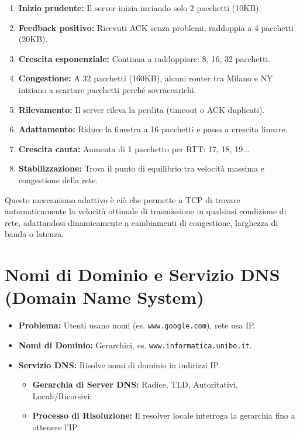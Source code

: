 \begin{enumerate}
    \item \textbf{Inizio prudente:} Il server inizia inviando solo 2 pacchetti (10KB).
    \item \textbf{Feedback positivo:} Ricevuti ACK senza problemi, raddoppia a 4 pacchetti (20KB).
    \item \textbf{Crescita esponenziale:} Continua a raddoppiare: 8, 16, 32 pacchetti.
    \item \textbf{Congestione:} A 32 pacchetti (160KB), alcuni router tra Milano e NY iniziano a scartare pacchetti perché sovraccarichi.
    \item \textbf{Rilevamento:} Il server rileva la perdita (timeout o ACK duplicati).
    \item \textbf{Adattamento:} Riduce la finestra a 16 pacchetti e passa a crescita lineare.
    \item \textbf{Crescita cauta:} Aumenta di 1 pacchetto per RTT: 17, 18, 19...
    \item \textbf{Stabilizzazione:} Trova il punto di equilibrio tra velocità massima e congestione della rete.
\end{enumerate}

Questo meccanismo adattivo è ciò che permette a TCP di trovare automaticamente la velocità ottimale di trasmissione in qualsiasi condizione di rete, adattandosi dinamicamente a cambiamenti di congestione, larghezza di banda o latenza.

\section{Nomi di Dominio e Servizio DNS (Domain Name System)}
\begin{itemize}
    \item \textbf{Problema:} Utenti usano nomi (es. \texttt{www.google.com}), rete usa IP.
    \item \textbf{Nomi di Dominio:} Gerarchici, es. \texttt{www.informatica.unibo.it}.
    \item \textbf{Servizio DNS:} Risolve nomi di dominio in indirizzi IP.
    \begin{itemize}
        \item \textbf{Gerarchia di Server DNS:} Radice, TLD, Autoritativi, Locali/Ricorsivi.
        \item \textbf{Processo di Risoluzione:} Il resolver locale interroga la gerarchia fino a ottenere l'IP.
    \end{itemize}
\end{itemize}

